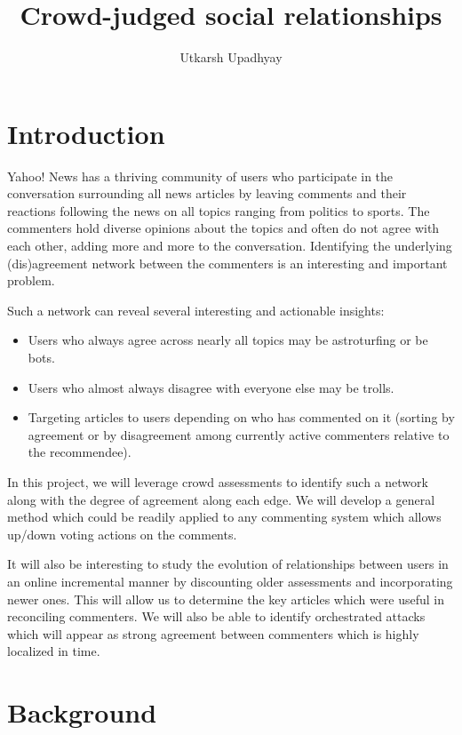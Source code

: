 \documentclass[11pt]{article}
\title{Crowd-judged social relationships}
\author{Utkarsh Upadhyay}
\date{}
\begin{document}
\maketitle

\section{Introduction}

Yahoo! News has a thriving community of users who participate in the conversation surrounding all news articles by leaving comments and their reactions following the news on all topics ranging from politics to sports. The commenters hold diverse opinions about the topics and often do not agree with each other, adding more and more to the conversation. Identifying the underlying (dis)agreement network between the commenters is an interesting and important problem.

Such a network can reveal several interesting and actionable insights:

\begin{itemize}
  \item Users who always agree across nearly all topics may be astroturfing or be bots.
  \item Users who almost always disagree with everyone else may be trolls.
  \item Targeting articles to users depending on who has commented on it (sorting by agreement or by disagreement among currently active commenters relative to the recommendee).
\end{itemize}

In this project, we will leverage crowd assessments to identify such a network along with the degree of agreement along each edge. We will develop a general method which could be readily applied to any commenting system which allows up/down voting actions on the comments.

It will also be interesting to study the evolution of relationships between users in an online incremental manner by discounting older assessments and incorporating newer ones. This will allow us to determine the key articles which were useful in reconciling commenters. We will also be able to identify orchestrated attacks which will appear as strong agreement between commenters which is highly localized in time.

\section{Background}
\end{document}
